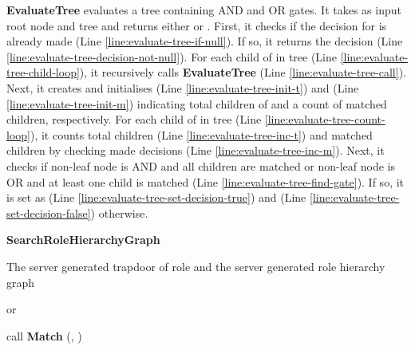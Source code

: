 \documentclass[final,5p,times,twocolumn]{elsarticle}
\newcommand{\algofontsize}{\fontsize{7}{8}\selectfont}
\begin{document}
\textbf{EvaluateTree} evaluates a tree containing AND and OR gates. It takes as input root node  and tree  and returns either  or . First, it checks if the decision for  is already made (Line \ref{line:evaluate-tree-if-null}). If so, it returns the decision (Line \ref{line:evaluate-tree-decision-not-null}). For each child  of  in tree  (Line \ref{line:evaluate-tree-child-loop}), it recursively calls \textbf{EvaluateTree} (Line \ref{line:evaluate-tree-call}). Next, it creates and initialises  (Line \ref{line:evaluate-tree-init-t}) and  (Line \ref{line:evaluate-tree-init-m}) indicating total children of  and a count of matched children, respectively. For each child  of  in tree  (Line \ref{line:evaluate-tree-count-loop}), it counts total children (Line \ref{line:evaluate-tree-inc-t}) and matched children by checking made decisions (Line \ref{line:evaluate-tree-inc-m}). Next, it checks if non-leaf node is AND and all children are matched or non-leaf node is OR and at least one child is matched (Line \ref{line:evaluate-tree-find-gate}). If so, it is set as  (Line \ref{line:evaluate-tree-set-decision-true}) and  (Line \ref{line:evaluate-tree-set-decision-false}) otherwise.






\begin{algorithm}[htp]
{\algofontsize
\caption{\textbf{SearchRoleHierarchyGraph}}

\label{algo:search-role-hierarchy-graph}

\begin{algorithmic}[1]

\REQUIRE The server generated trapdoor of role  and the server generated role hierarchy graph 

\ENSURE  or 

\medskip

 \label{line:search-rh-loop}

	\STATE  call \textbf{Match} (, ) \label{line:search-rh-call}

	\IF {} \label{line:search-rh-match}
		\RETURN  \label{line:search-rh-true}
	\ENDIF

\ENDFOR

\RETURN  \label{line:search-rh-false}

\end{algorithmic}
}
\end{algorithm}
\end{document}

